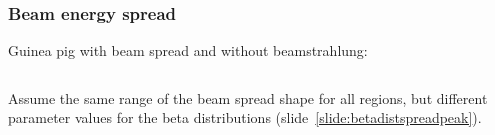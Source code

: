 \documentclass{beamer}
\begin{document}
\begin{frame}
\frametitle{Beam energy spread}\label{slide:beamspread}
Guinea pig \alert{with} beam spread and \alert{without} beamstrahlung:\\
\begin{columns}[c]
\column{6cm}
\column{6cm}
\end{columns}
Assume the same range of the beam spread shape for all regions,
but different parameter values for the beta distributions
(slide~\ref{slide:betadistspreadpeak}). 
\end{frame}
\end{document}
